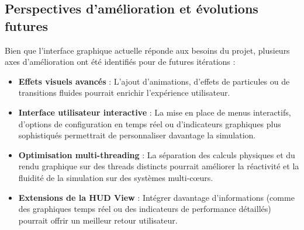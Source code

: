 \subsection{Perspectives d'amélioration et évolutions futures}\label{subsec:perspectives-d-evolution}
Bien que l'interface graphique actuelle réponde aux besoins du projet, plusieurs axes d'amélioration ont été identifiés pour de futures itérations :
\begin{itemize}
    \item \textbf{Effets visuels avancés} : L'ajout d'animations, d'effets de particules ou de transitions fluides pourrait enrichir l'expérience utilisateur.
    \item \textbf{Interface utilisateur interactive} : La mise en place de menus interactifs, d'options de configuration en temps réel ou d'indicateurs graphiques plus sophistiqués permettrait de personnaliser davantage la simulation.
    \item \textbf{Optimisation multi-threading} : La séparation des calculs physiques et du rendu graphique sur des threads distincts pourrait améliorer la réactivité et la fluidité de la simulation sur des systèmes multi-cœurs.
    \item \textbf{Extensions de la HUD View} : Intégrer davantage d'informations (comme des graphiques temps réel ou des indicateurs de performance détaillés) pourrait offrir un meilleur retour utilisateur.
\end{itemize}
